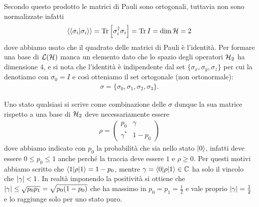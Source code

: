 Secondo questo prodotto le matrici di Pauli sono ortogonali, tuttavia non sono normalizzate infatti 
\begin{align*}
  \langle \langle \sigma_i|\sigma_i \rangle \rangle = \operatorname{\textnormal{Tr}} \left[ \sigma_i^\dag \sigma_i \right] = \operatorname{\textnormal{Tr}} I = \dim \operatorname{\mathcal{H}} = 2
\end{align*}
dove abbiamo usato che il quadrato delle matrici di Pauli è l'identità. Per formare una base di $ \operatorname{\mathcal{L}}(\operatorname{\mathcal{H}}) $ manca un elemento dato che lo spazio degli 
operatori $ \operatorname{\mathcal{H}}_2 $ ha dimensione $ 4 $, e si nota che l'identità è indipendente dal set $ \{\sigma_x, \sigma_y, \sigma_z\} $ per cui la denotiamo con 
$ \sigma_0 = I $ e così otteniamo il set ortogonale (non ortonormale):
\begin{align*}
  \sigma = \{\sigma_0, \sigma_1, \sigma_2, \sigma_3\}.
\end{align*}

Uno stato qualsiasi si scrive come combinazione delle $ \sigma $ dunque la sua matrice rispetto a una base di $ \operatorname{\mathcal{H}}_2 $ deve necessariamente essere 
\begin{align*}
  \rho = 
  \begin{pmatrix}
    p_0 & \gamma \\
    \gamma^* & 1 - p_0
  \end{pmatrix}
\end{align*}
dove abbiamo indicato con $ p_0 $ la probabilità che sia nello stato $ \vert 0 \rangle $, infatti deve essere $ 0 \leq p_0 \leq 1 $ anche perché la traccia deve 
essere $ 1 $ e $ \rho \geq 0 $. Per questi motivi abbiamo scritto che $ \langle 1 | \rho | 1 \rangle = 1 - p_0 $, mentre $ \gamma = \langle 0 | \rho | 1 \rangle \in \mathbb{C} $ 
ha solo il vincolo che $ \left|{\gamma}\right| < 1 $. In realtà imponendo la positività si ottiene che $ \left|{\gamma}\right| \leq \sqrt{p_0 p_1} = \sqrt{p_0 (1 - p_0)} $ 
che ha massimo in $ p_0 = p_1 = \frac12 $ e vale proprio $ \left|{\gamma}\right| = \frac12 $ e lo raggiunge solo per uno stato puro.

